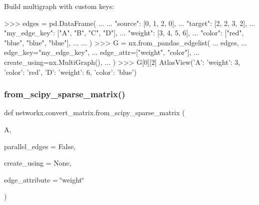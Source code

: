 \begin{DoxyVerb}
Build multigraph with custom keys:

>>> edges = pd.DataFrame(
...     {
...         "source": [0, 1, 2, 0],
...         "target": [2, 2, 3, 2],
...         "my_edge_key": ["A", "B", "C", "D"],
...         "weight": [3, 4, 5, 6],
...         "color": ["red", "blue", "blue", "blue"],
...     }
... )
>>> G = nx.from_pandas_edgelist(
...     edges,
...     edge_key="my_edge_key",
...     edge_attr=["weight", "color"],
...     create_using=nx.MultiGraph(),
... )
>>> G[0][2]
AtlasView({'A': {'weight': 3, 'color': 'red'}, 'D': {'weight': 6, 'color': 'blue'}})\end{DoxyVerb}
 \mbox{\label{namespacenetworkx_1_1convert__matrix_ac8fbd2e587cd297b41557ad1299a9e7d}} 
\subsubsection{\texorpdfstring{from\+\_\+scipy\+\_\+sparse\+\_\+matrix()}{from\_scipy\_sparse\_matrix()}}
{\footnotesize\ttfamily def networkx.\+convert\+\_\+matrix.\+from\+\_\+scipy\+\_\+sparse\+\_\+matrix (\begin{DoxyParamCaption}\item[{}]{A,  }\item[{}]{parallel\+\_\+edges = {\ttfamily False},  }\item[{}]{create\+\_\+using = {\ttfamily None},  }\item[{}]{edge\+\_\+attribute = {\ttfamily \char`\"{}weight\char`\"{}} }\end{DoxyParamCaption})}

